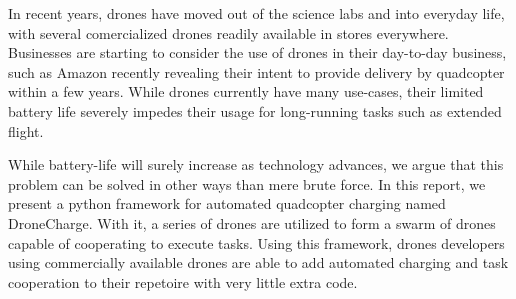 In recent years, drones have moved out of the science labs and into everyday life, with several comercialized drones readily available in stores everywhere. Businesses are starting to consider the use of drones in their day-to-day business, such as Amazon recently revealing their intent to provide delivery by quadcopter within a few years. While drones currently have many use-cases, their limited battery life severely impedes their usage for long-running tasks such as extended flight.

While battery-life will surely increase as technology advances, we argue that this problem can be solved in other ways than mere brute force. In this report, we present a python framework for automated quadcopter charging named DroneCharge. With it, a series of drones are utilized to form a swarm of drones capable of cooperating to execute tasks. Using this framework, drones developers using commercially available drones are able to add automated charging and task cooperation to their repetoire with very little extra code.
